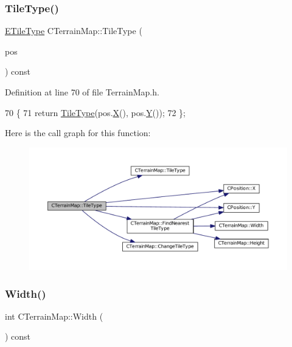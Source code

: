\subsubsection{\texorpdfstring{Tile\+Type()}{TileType()}\hspace{0.1cm}{\footnotesize\ttfamily [2/2]}}
{\footnotesize\ttfamily \hyperlink{classCTerrainMap_aff2ab991e237269941416dd79d8871d4}{E\+Tile\+Type} C\+Terrain\+Map\+::\+Tile\+Type (\begin{DoxyParamCaption}\item[{const \hyperlink{classCPosition}{C\+Position} \&}]{pos }\end{DoxyParamCaption}) const\hspace{0.3cm}{\ttfamily [inline]}}



Definition at line 70 of file Terrain\+Map.\+h.


\begin{DoxyCode}
70                                                       \{
71             \textcolor{keywordflow}{return} \hyperlink{classCTerrainMap_a7e0e440467a09cb1c59e2bdbec01ccb4}{TileType}(pos.\hyperlink{classCPosition_a9a6b94d3b91df1492d166d9964c865fc}{X}(), pos.\hyperlink{classCPosition_a1aa8a30e2f08dda1f797736ba8c13a87}{Y}());
72         \};
\end{DoxyCode}
Here is the call graph for this function\+:
\nopagebreak
\begin{figure}[H]
\begin{center}
\leavevmode
\includegraphics[width=350pt]{classCTerrainMap_a3a7229412b3391835dd6036439e5c6c0_cgraph}
\end{center}
\end{figure}
\hypertarget{classCTerrainMap_a34cb754aa9b26e85a73377159f2527d7}{}\label{classCTerrainMap_a34cb754aa9b26e85a73377159f2527d7} 
\subsubsection{\texorpdfstring{Width()}{Width()}}
{\footnotesize\ttfamily int C\+Terrain\+Map\+::\+Width (\begin{DoxyParamCaption}{ }\end{DoxyParamCaption}) const}



